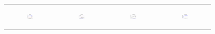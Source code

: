 ~\newpage\begin{figure}[ht]
  \centering
  \begin{tabular}{cccc}
	  \begin{subfigure}[h]{0.22\textwidth}
	  	\includegraphics[width=110pt]{images/runtime_ring_setcover.pdf}
			\caption{}
			\label{appfig:runtime_ring_setcover}
	  \end{subfigure} &
	  \begin{subfigure}[h]{0.22\textwidth}
	  	\includegraphics[width=110pt]{images/speedup_ring_setcover.pdf}
			\caption{}
			\label{appfig:speedup_ring_setcover}
	  \end{subfigure} &
	  \begin{subfigure}[h]{0.22\textwidth}
	  	\includegraphics[width=110pt]{images/diffFA_CF2G_ring_setcover.pdf}
			\caption{}
			\label{appfig:diffFA_CF2G_ring_setcover}
	  \end{subfigure} &
	  \begin{subfigure}[h]{0.22\textwidth}
	  	\includegraphics[width=110pt]{images/validated_CC2G_ring_setcover.pdf}
			\caption{}
			\label{appfig:validated_CC2G_ring_setcover}
	  \end{subfigure} \\

\end{tabular}
\end{figure}
